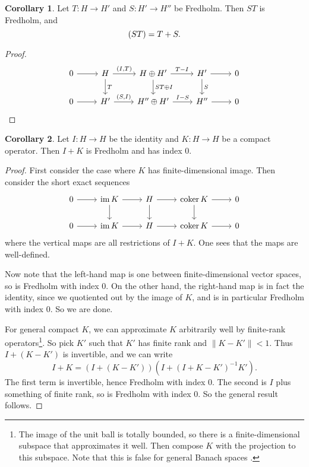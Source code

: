 \documentclass{shortart}
\theoremstyle{definition}
\newtheorem*{cor}{Corollary}
\let\index\relax
\DeclareMathOperator{\coker}{coker}
\DeclareMathOperator{\index}{idx}
\DeclareMathOperator{\im}{im}
\newcommand\id{I}
\begin{document}
\begin{cor}
  Let $T: H \to H'$ and $S : H' \to H''$ be Fredholm. Then $ST$ is Fredholm, and
  \[
    \index (ST) = \index T + \index S.
  \]
\end{cor}

\begin{proof}
  \[
    \begin{tikzcd}
      0 \ar[r] & H \ar[r, "{(\id, T)}"] \ar[d, "T"] & H \oplus H' \ar[r, "T - \id"] \ar[d, "ST \oplus \id"]& H' \ar[r] \ar[d, "S"] & 0\\
      0 \ar[r] & H' \ar[r, "{(S, \id)}"] & H'' \oplus H' \ar[r, "\id - S"] & H'' \ar[r] & 0
    \end{tikzcd}\qedshift
  \]
\end{proof}

\begin{cor}
  Let $\id: H \to H$ be the identity and $K : H \to H$ be a compact operator. Then $\id + K$ is Fredholm and has index $0$.
\end{cor}

\begin{proof}
  First consider the case where $K$ has finite-dimensional image. Then consider the short exact sequences
  \[
    \begin{tikzcd}
      0 \ar[r] & \im K \ar[r] \ar[d] & H \ar[r] \ar[d]& \coker K \ar[r] \ar[d] & 0\\
      0 \ar[r] & \im K \ar[r] & H \ar[r] & \coker K \ar[r] & 0
    \end{tikzcd}
  \]
  where the vertical maps are all restrictions of $\id + K$. One sees that the maps are well-defined.

  Now note that the left-hand map is one between finite-dimensional vector spaces, so is Fredholm with index $0$. On the other hand, the right-hand map is in fact the identity, since we quotiented out by the image of $K$, and is in particular Fredholm with index $0$. So we are done.

  For general compact $K$, we can approximate $K$ arbitrarily well by finite-rank operators\footnote{The image of the unit ball is totally bounded, so there is a finite-dimensional subspace that approximates it well. Then compose $K$ with the projection to this subspace. Note that this is false for general Banach spaces \cite{enflo1973}.}. So pick $K'$ such that $K'$ has finite rank and $\|K - K'\| < 1$. Thus $\id + (K - K')$ is invertible, and we can write
  \[
    \id + K = (\id + (K - K')) (\id + (\id + K - K')^{-1} K').
  \]
  The first term is invertible, hence Fredholm with index $0$. The second is $\id$ plus something of finite rank, so is Fredholm with index $0$. So the general result follows.
\end{proof}
\end{document}
